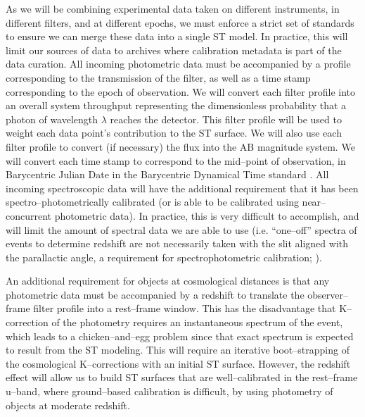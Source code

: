 As we will be combining experimental data taken on different instruments, in
different filters, and at different epochs, we must enforce a strict set of
standards to ensure we can merge these data into a single ST model. In practice,
this will limit our sources of data to archives where calibration metadata is
part of the data curation. All incoming photometric data must be accompanied by
a profile corresponding to the transmission of the filter, as well as a time
stamp corresponding to the epoch of observation. We will convert each filter
profile into an overall system throughput representing the dimensionless
probability that a photon of wavelength $\lambda$ reaches the detector.  This
filter profile will be used to weight each data point's contribution to the ST
surface.  We will also use each filter profile to convert (if necessary) the
flux into the AB magnitude system. We will convert each  time stamp to
correspond to the mid--point of observation, in Barycentric Julian Date in the
Barycentric Dynamical Time standard \citep{2010PASP..122..935E}. All incoming
spectroscopic data will have the additional requirement that it has been
spectro--photometrically calibrated (or is able to be calibrated using
near--concurrent photometric data).  In practice, this is very difficult to
accomplish, and will limit the amount of spectral data we are able to use (i.e.
``one--off'' spectra of events to determine redshift are not necessarily taken
with the slit aligned with the parallactic angle, a requirement for
spectrophotometric calibration; \citealt{1982PASP...94..715F}).

An additional requirement for objects at cosmological distances is that any
photometric data must be accompanied by a redshift to translate the
observer--frame filter profile into a rest--frame window. This has the
disadvantage that K--correction of the photometry \citep{2002astro.ph.10394H}
requires an instantaneous spectrum of the event, which leads to a
chicken--and--egg problem since that exact spectrum is expected to result from
the ST modeling.  This will require an iterative boot--strapping of the
cosmological K--corrections with an initial ST surface.  However, the redshift
effect will allow us to build ST surfaces that are well--calibrated in the
rest--frame u--band, where ground--based calibration is difficult, by using
photometry of objects at moderate redshift.

\smallskip

